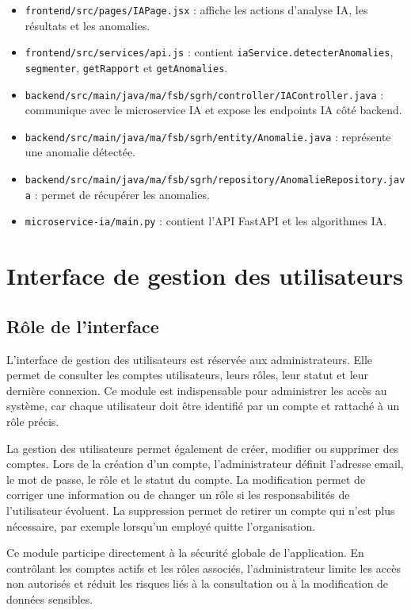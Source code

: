 \documentclass[12pt,a4paper]{report}
\begin{document}
\begin{itemize}
    \item \texttt{frontend/src/pages/IAPage.jsx} : affiche les actions d'analyse IA, les résultats et les anomalies.
    \item \texttt{frontend/src/services/api.js} : contient \texttt{iaService.detecterAnomalies}, \texttt{segmenter}, \texttt{getRapport} et \texttt{getAnomalies}.
    \item \texttt{backend/src/main/java/ma/fsb/sgrh/controller/IAController.java} : communique avec le microservice IA et expose les endpoints IA côté backend.
    \item \texttt{backend/src/main/java/ma/fsb/sgrh/entity/Anomalie.java} : représente une anomalie détectée.
    \item \texttt{backend/src/main/java/ma/fsb/sgrh/repository/AnomalieRepository.java} : permet de récupérer les anomalies.
    \item \texttt{microservice-ia/main.py} : contient l'API FastAPI et les algorithmes IA.
\end{itemize}

\section{Interface de gestion des utilisateurs}

\subsection{Rôle de l'interface}

L'interface de gestion des utilisateurs est réservée aux administrateurs. Elle permet de consulter les comptes utilisateurs, leurs rôles, leur statut et leur dernière connexion. Ce module est indispensable pour administrer les accès au système, car chaque utilisateur doit être identifié par un compte et rattaché à un rôle précis.

La gestion des utilisateurs permet également de créer, modifier ou supprimer des comptes. Lors de la création d'un compte, l'administrateur définit l'adresse email, le mot de passe, le rôle et le statut du compte. La modification permet de corriger une information ou de changer un rôle si les responsabilités de l'utilisateur évoluent. La suppression permet de retirer un compte qui n'est plus nécessaire, par exemple lorsqu'un employé quitte l'organisation.

Ce module participe directement à la sécurité globale de l'application. En contrôlant les comptes actifs et les rôles associés, l'administrateur limite les accès non autorisés et réduit les risques liés à la consultation ou à la modification de données sensibles.
\end{document}
